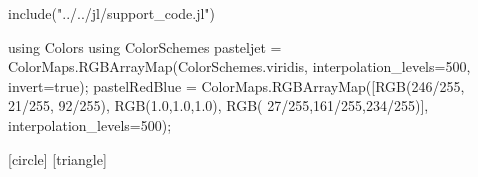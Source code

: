 



\begin{jlcode}
	include("../../jl/support_code.jl")

	using Colors
	using ColorSchemes
	pasteljet = ColorMaps.RGBArrayMap(ColorSchemes.viridis, interpolation_levels=500, invert=true);
    pastelRedBlue = ColorMaps.RGBArrayMap([RGB(246/255, 21/255, 92/255),
										   RGB(1.0,1.0,1.0),
										   RGB( 27/255,161/255,234/255)], interpolation_levels=500);
\end{jlcode}



[circle]
[triangle]

{}

{
    \vspace*{0.7cm}
    \insertframetitle
}


\newcommand{\dset}{\mathcal{D}}
\newcommand{\params}{\vect \theta}

\newcommand{\true}{\text{true}}
\newcommand{\false}{\text{false}}
\newcommand{\transpose}{\top}

\newcommand{\noisy}[1]{\tilde{#1}}

\newcommand{\mat}[1]{\vect{#1}}
\renewcommand{\vec}[1]{\vect{#1}}

\usepackage{mathtools}
\DeclarePairedDelimiter{\paren}{\lparen}{\rparen}
\DeclarePairedDelimiter{\brock}{\lbrack}{\rbrack}
\DeclarePairedDelimiter{\curly}{\{}{\}}
\DeclarePairedDelimiter{\norm}{\lVert}{\rVert}
\DeclarePairedDelimiter{\abs}{\lvert}{\rvert}
\DeclarePairedDelimiter{\anglebrackets}{\langle}{\rangle}
\DeclarePairedDelimiter{\ceil}{\lceil}{\rceil}
\DeclarePairedDelimiter{\floor}{\lfloor}{\rfloor}
\DeclarePairedDelimiter{\card}{|}{|}


